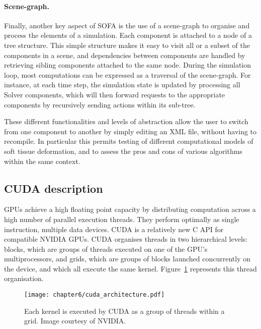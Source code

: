 \paragraph{Scene-graph.}
Finally, another key aspect of SOFA is the use of a scene-graph to organise and process the elements of a simulation. Each component is attached to a node of a tree structure. This simple structure makes it easy to visit all or a subset of the components in a scene, and dependencies between components are handled by retrieving sibling components attached to the same node. 
During the simulation loop, most computations can be expressed as a traversal of the scene-graph. For instance, at each time step, the simulation state is updated by processing all Solver components, which will then forward requests to the appropriate components by recursively sending actions within its sub-tree.

These different functionalities and levels of abstraction allow the user to switch from one component to another by simply editing an XML file, without having to recompile. In particular this permits testing of different computational models of soft tissue deformation, and to assess the pros and cons of various algorithms within the same context.


	
	\subsection{CUDA description}
GPUs achieve a high floating point capacity by distributing computation across a high number of parallel execution threads. They perform optimally as single instruction, multiple data devices. CUDA is a relatively new C API for compatible NVIDIA GPUs. CUDA organises threads in two hierarchical levels: blocks, which are groups of threads executed on one of the GPU's multiprocessors, and grids, which are groups of blocks launched concurrently on the device, and which all execute the same kernel. Figure~\ref{chap6:fig-cuda} represents this thread organisation. 

\begin{figure}
\begin{center}
\texttt{[image: chapter6/cuda\_architecture.pdf]} 
\caption[CUDA architecture] {Each kernel is executed by CUDA as a group of threads within a grid. Image courtesy of NVIDIA. }
\label{chap6:fig-cuda}
\end{center}
\end{figure}           

